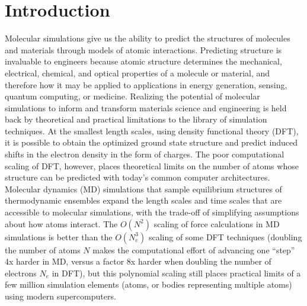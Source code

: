 \chapter{Introduction}
Molecular simulations give us the  ability to predict the structures of molecules and materials through models of atomic interactions.   
Predicting structure is invaluable to engineers because atomic structure determines the mechanical, electrical, chemical, and optical properties of a molecule or material, and therefore how it may be applied to applications in energy generation, sensing, quantum computing, or medicine. 
Realizing the potential of molecular simulations to inform and transform materials science and engineering is held back by theoretical and practical limitations to the library of simulation techniques.
At the smallest length scales, using density functional theory (DFT), it is possible to obtain the optimized ground state structure and predict induced shifts in the electron density in the form of charges.
The poor computational scaling of DFT, however, places theoretical limits on the number of atoms whose structure can be predicted with today's common computer architectures.
Molecular dynamics (MD) simulations that sample equilibrium structures of thermodynamic ensembles expand the length scales and time scales that are accessible to molecular simulations, with the trade-off of simplifying assumptions about how atoms interact.
The $O(N^2)$ scaling of force calculations in MD simulations is better than the $O(N_e^3)$ scaling of some DFT techniques (doubling the number of atoms $N$ makes the computational effort of advancing one ``step'' 4x harder in MD, versus a factor 8x harder when doubling the number of electrons $N_e$ in DFT), but this polynomial scaling still places practical limits of a few million simulation elements (atoms, or bodies representing multiple atoms) using modern supercomputers. 
